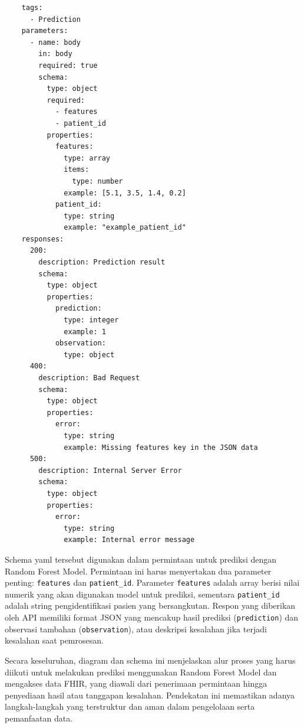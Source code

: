 \begin{lstlisting}
    tags:
      - Prediction
    parameters:
      - name: body
        in: body
        required: true
        schema:
          type: object
          required:
            - features
            - patient_id
          properties:
            features:
              type: array
              items:
                type: number
              example: [5.1, 3.5, 1.4, 0.2]
            patient_id:
              type: string
              example: "example_patient_id"
    responses:
      200:
        description: Prediction result
        schema:
          type: object
          properties:
            prediction:
              type: integer
              example: 1
            observation:
              type: object
      400:
        description: Bad Request
        schema:
          type: object
          properties:
            error:
              type: string
              example: Missing features key in the JSON data
      500:
        description: Internal Server Error
        schema:
          type: object
          properties:
            error:
              type: string
              example: Internal error message
    \end{lstlisting}

    Schema yaml tersebut digunakan dalam permintaan untuk prediksi dengan Random Forest Model. Permintaan ini harus menyertakan dua parameter penting: \texttt{features} dan \texttt{patient\_id}. Parameter \texttt{features} adalah array berisi nilai numerik yang akan digunakan model untuk prediksi, sementara \texttt{patient\_id} adalah string pengidentifikasi pasien yang bersangkutan. Respon yang diberikan oleh API memiliki format JSON yang mencakup hasil prediksi (\texttt{prediction}) dan observasi tambahan (\texttt{observation}), atau deskripsi kesalahan jika terjadi kesalahan saat pemrosesan.

    Secara keseluruhan, diagram dan schema ini menjelaskan alur proses yang harus diikuti untuk melakukan prediksi menggunakan Random Forest Model dan mengakses data FHIR, yang diawali dari penerimaan permintaan hingga penyediaan hasil atau tanggapan kesalahan. Pendekatan ini memastikan adanya langkah-langkah yang terstruktur dan aman dalam pengelolaan serta pemanfaatan data.
    